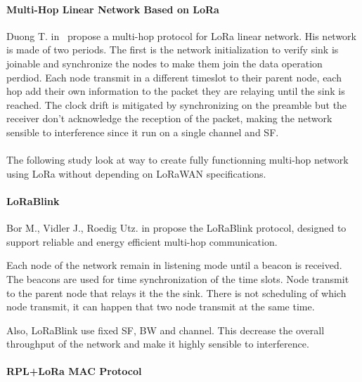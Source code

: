 
\paragraph{Multi-Hop Linear Network Based on LoRa}

Duong T. in~\cite{duong2018} propose a multi-hop protocol for LoRa linear
network. 
His network is made of two periods. The first is the network initialization to
verify sink is joinable and synchronize the nodes to make them join the data
operation perdiod.
Each node transmit in a different timeslot to their parent node, each hop add
their own information to the packet they are relaying until the sink is
reached.
The clock drift is mitigated by synchronizing on the preamble but the receiver
don't acknowledge the reception of the packet, making the network sensible to
interference since it run on a single channel and SF.

\paragraph{}

The following study look at way to create fully functionning multi-hop network
using LoRa without depending on LoRaWAN specifications.

\paragraph{LoRaBlink}

Bor M., Vidler J., Roedig Utz. in \cite{lorablink} propose the LoRaBlink
protocol, designed to support reliable and energy efficient multi-hop
communication.

Each node of the network remain in listening mode until a beacon is received.
The beacons are used for time synchronization of the time slots.
Node transmit to the parent node that relays it the the sink.
There is not scheduling of which node transmit, it can happen that two node 
transmit at the same time.


Also, LoRaBlink use fixed SF, BW and channel. This decrease the overall throughput 
of the network and make it highly sensible to interference.

\paragraph{RPL+LoRa MAC Protocol}

